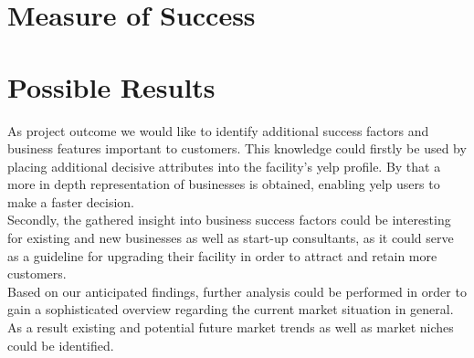 \section{Measure of Success}
\label{cha:success}


\section{Possible Results}
\label{cha:conclusion}
As project outcome we would like to identify additional success factors and business features important to customers. This knowledge could firstly be used by placing additional decisive attributes into the facility's yelp profile. By that a more in depth representation of businesses is obtained, enabling yelp users to make a faster decision.\\ 
Secondly, the gathered insight into business success factors could be interesting for existing and new businesses as well as start-up consultants, as it could serve as a guideline for upgrading their facility in order to attract and retain more customers.\\ 
Based on our anticipated findings, further analysis could be performed in order to gain a sophisticated overview regarding the current market situation in general. As a result existing and potential future market trends as well as market niches could be identified.\\ 